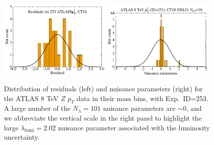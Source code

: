 \begin{figure}[t]
	\includegraphics[width=0.49\textwidth]{./fig/res_his_CT18-253_4_ect.pdf}
	\includegraphics[width=0.49\textwidth]{./fig/rk_his_CT18-253_10_v3_ect.pdf}	
	\caption{Distribution of residuals (left) and nuisance parameters (right) for the ATLAS 8 TeV $Z$ $p_T$ data in their mass bins, with Exp.~ID=253. A large number of the $N_\lambda\! =\! 101$ nuisance parameters are $\sim\! 0$, and we abbreviate the
	vertical scale in the right panel to highlight the large $\lambda_\mathrm{lumi}\! =\! 2.02$ nuisance parameter associated with the luminosity uncertainty.
		\label{fig:res_rk_6}}
\end{figure}

